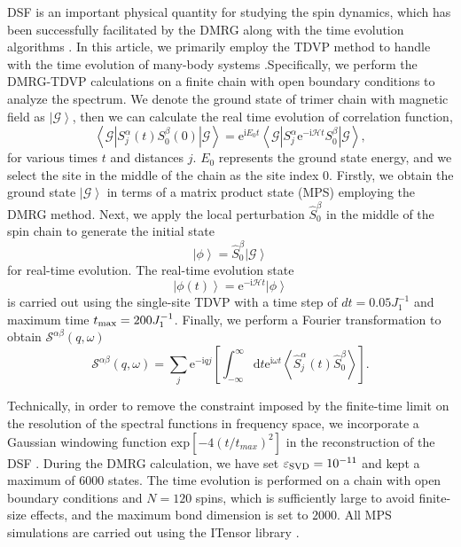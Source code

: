 \documentclass[aps,prx,showpacs,floatfix,twocolumn,superscriptaddress,nofootinbib,longbibliography]{revtex4-2}
\begin{document}
DSF is an important physical quantity for studying the spin dynamics, which  has been successfully facilitated by the DMRG along with the time evolution algorithms \cite{PhysRevLett.93.076401,PhysRevB.79.245101,PhysRevB.94.085136,PAECKEL2019167998,PhysRevLett.125.187201,PhysRevB.108.L220401}.
In this article, we primarily employ the TDVP method to  handle with  the time evolution of many-body systems \cite{PhysRevLett.107.070601, PhysRevB.94.165116}.Specifically, we perform the DMRG-TDVP calculations on a finite chain with open boundary conditions to analyze the spectrum. We denote the ground state of trimer chain with magnetic field as $\left| \mathcal{G} \right\rangle$, then we can  calculate the real time evolution of correlation function,
\begin{equation}
\left\langle \mathcal{ G} \left|S_j^{\alpha}(t) S_0^{\beta}(0)\right| \mathcal{G} \right\rangle=\mathrm{e}^{\mathrm{i} E_0 t}\left\langle \mathcal{G}\left|S_j^{\alpha} \mathrm{e}^{-\mathrm{i} \mathcal{H} t} S_0^{\beta}\right| \mathcal{G}\right\rangle,
\end{equation}
for various times $t$ and distances $j$.  $E_0$ represents the ground state energy, and we  select the site in the middle of the chain as the site  index $0$.  Firstly, we obtain the ground state $\left| \mathcal{G} \right\rangle$ in terms of a matrix product state (MPS)  employing the DMRG method. Next, we  apply the local perturbation $\hat{S}_0^\beta$ in the middle of the spin chain to generate the initial state
 \begin{equation}
	\left| \phi \right\rangle = \hat{S}_0^\beta \left|  \mathcal{G} \right\rangle
 \end{equation}
 for real-time evolution. The real-time evolution state 
  \begin{equation}
	\left| \phi(t) \right\rangle = \mathrm{e}^{-\mathrm{i} \mathcal{H} t} \left| \phi \right\rangle
  \end{equation}
 is carried out using the single-site TDVP with a time step of $dt=0.05J_1^{-1}$ and maximum time $t_{\rm{max}}=200J_1^{-1}$. Finally, we perform a Fourier transformation to obtain $\mathcal{S}^{\alpha \beta} (q, \omega)$
\begin{equation}
\mathcal{S}^{\alpha \beta}(q, \omega)=\sum_j \mathrm{e}^{-\mathrm{i} q j}\left[\int_{-\infty}^{\infty} \mathrm{d} t \mathrm{e}^{\mathrm{i} \omega t}\left\langle\hat{S}_j^\alpha(t) \hat{S}_0^\beta\right\rangle\right].
\end{equation}

Technically, in order to remove the constraint imposed by the finite-time limit on the resolution of the spectral functions in frequency space, we incorporate a Gaussian windowing function $\mathrm{exp}\left[-4(t/t_{max})^2 \right]$ in the reconstruction of the DSF \cite{PhysRevLett.93.076401}. During the DMRG calculation, we have set $\varepsilon_{\rm{SVD}}=10^{-11}$ and kept  a maximum of  $6000$ states. The time evolution is performed  on a chain with open boundary conditions and $N=120$ spins, which is  sufficiently large to avoid  finite-size effects, and the maximum bond dimension is set to $2000$. All MPS simulations are carried out using the ITensor library \cite{SciPostPhysCodeb.4}. 
 
\end{document}
